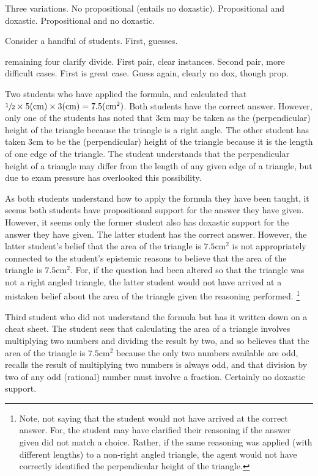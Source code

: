 \begin{note}[P/D Example]
  Three variations.
  No propositional (entails no doxastic).
  Propositional and doxastic.
  Propositional and no doxastic.

  Consider a handful of students.
  First, guesses.

  remaining four clarify divide.
  First pair, clear instances.
  Second pair, more difficult cases.
  First is great case.
  Guess again, clearly no dox, though prop.

  Two students who have applied the formula, and calculated that \(\sfrac{1}{2} \times 5\text{(cm)} \times 3\text{(cm)} = 7.5(\text{cm}^{2})\).
  Both students have the correct answer.
  However, only one of the students has noted that \(3\text{cm}\) may be taken as the (perpendicular) height of the triangle because the triangle is a right angle.
  The other student has taken \(3\text{cm}\) to be the (perpendicular) height of the triangle because it is the length of one edge of the triangle.
  The student understands that the perpendicular height of a triangle may differ from the length of any given edge of a triangle, but due to exam pressure has overlooked this possibility.

  As both students understand how to apply the formula they have been taught, it seems both students have propositional support for the answer they have given.
  However, it seems only the former student also has doxastic support for the answer they have given.
  The latter student has the correct answer.
  However, the latter student's belief that the area of the triangle is \(7.5\text{cm}^{2}\) is not appropriately connected to the student's epistemic reasons to believe that the area of the triangle is \(7.5\text{cm}^{2}\).
  For, if the question had been altered so that the triangle was not a right angled triangle, the latter student would not have arrived at a mistaken belief about the area of the triangle given the reasoning performed.\nolinebreak
  \footnote{
    Note, not saying that the student would not have arrived at the correct answer.
    For, the student may have clarified their reasoning if the answer given did not match a choice.
    Rather, if the same reasoning was applied (with different lengths) to a non-right angled triangle, the agent would not have correctly identified the perpendicular height of the triangle.
  }

  Third student who did not understand the formula but has it written down on a cheat sheet.
  The student sees that calculating the area of a triangle involves multiplying two numbers and dividing the result by two, and so believes that the area of the triangle is \(7.5\text{cm}^{2}\) because the only two numbers available are odd, recalls the result of multiplying two numbers is always odd, and that division by two of any odd (rational) number must involve a fraction.
  Certainly no doxastic support.


\end{note}
